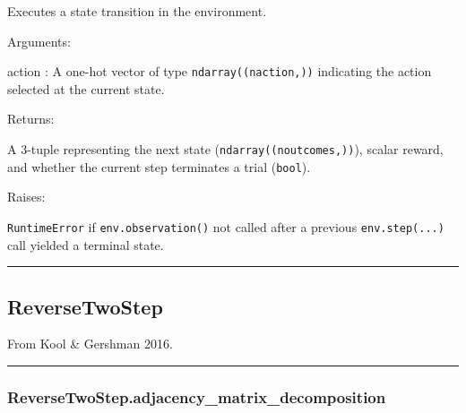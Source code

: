 \begin{Shaded}
\begin{Highlighting}[]
\end{Highlighting}
\end{Shaded}

Executes a state transition in the environment.

Arguments:

action : A one-hot vector of type \texttt{ndarray((naction,))}
indicating the action selected at the current state.

Returns:

A 3-tuple representing the next state (\texttt{ndarray((noutcomes,))}),
scalar reward, and whether the current step terminates a trial
(\texttt{bool}).

Raises:

\texttt{RuntimeError} if \texttt{env.observation()} not called after a
previous \texttt{env.step(...)} call yielded a terminal state.

\begin{center}\rule{0.5\linewidth}{\linethickness}\end{center}

\subsection{ReverseTwoStep}\label{reversetwostep}

\begin{Shaded}
\begin{Highlighting}[]
\end{Highlighting}
\end{Shaded}

From Kool \& Gershman 2016.

\begin{center}\rule{0.5\linewidth}{\linethickness}\end{center}

\subsubsection{ReverseTwoStep.adjacency\_matrix\_decomposition}\label{reversetwostep.adjacency_matrix_decomposition}

\begin{Shaded}
\begin{Highlighting}[]
\NormalTok{)}
\end{Highlighting}
\end{Shaded}

